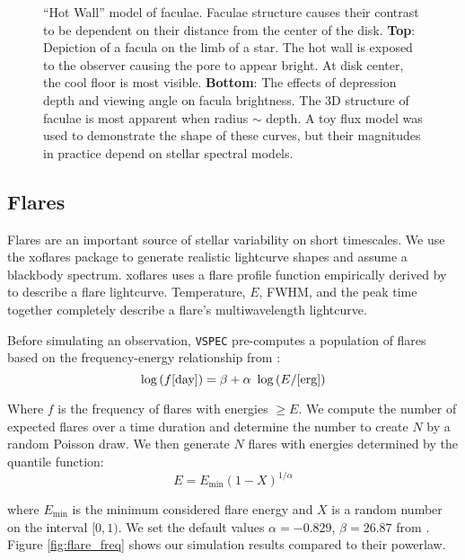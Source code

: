 \documentclass[twocolumn]{aastex631}
\newcommand{\vspec}[1]{\texttt{VSPEC}#1}
\begin{document}
\begin{figure}
    \centering
    \caption{
        ``Hot Wall'' model of faculae. Faculae structure causes their contrast to be dependent on their distance
        from the center of the disk. {\bf Top}: Depiction of a facula on the limb of a star. The hot wall is exposed
        to the observer causing the pore to appear bright. At disk center, the cool floor is most visible. {\bf Bottom}:
        The effects of depression depth and viewing angle on facula brightness. The 3D structure of faculae is most apparent
        when radius $\sim$ depth. A toy flux model was used to demonstrate the shape of these curves, but their magnitudes
        in practice depend on stellar spectral models.
        }
    \label{fig:fac_struct}
\end{figure}

\subsection{Flares \label{subsec:flares}}
Flares are an important source of stellar variability on short timescales. We use the {\sc xoflares}
package \citep{barclay2020} to generate realistic lightcurve shapes and assume a blackbody spectrum.
{\sc xoflares} uses a flare profile function empirically derived by \citet{davenport2016} to
describe a flare lightcurve. Temperature, $E$, FWHM, and the peak time together completely describe a flare's multiwavelength lightcurve.

Before simulating an observation, \vspec{} pre-computes a population of flares based on the frequency-energy relationship from \citet{gao2022}:
\begin{equation} \label{eq:flare_freq}
    \log{(f{\rm [day]})} = \beta + \alpha~\log{(E/{\rm [erg]})}
\end{equation}

Where $f$ is the frequency of flares with energies $\ge E$.
We compute the number of expected flares over a time duration and determine the number to create $N$ by a random Poisson draw.
We then generate $N$ flares with energies determined by the quantile function:
\begin{equation}
    E = E_{\text{min}} (1-X)^{1/\alpha}
\end{equation}

where $E_{\text{min}}$ is the minimum considered flare energy and $X$ is a random number on the interval $[0,1)$.
We set the default values $\alpha=-0.829$, $\beta=26.87$ from \citet{gao2022}. Figure \ref{fig:flare_freq}
shows our simulation results compared to their powerlaw.
\end{document}
